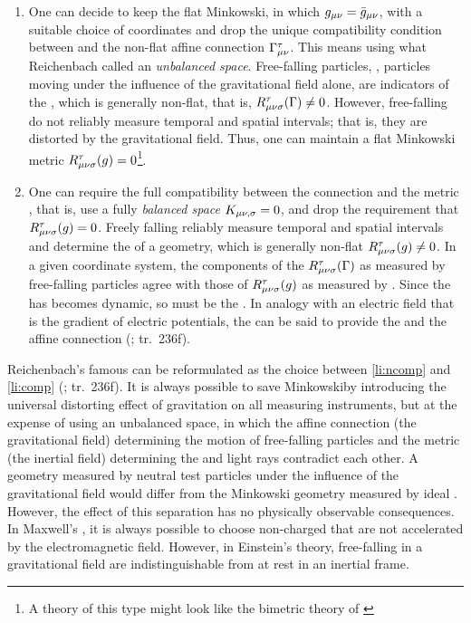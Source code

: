 \documentclass[final]{article}
\renewcommand{\Mink}{Minkowski\xspace}
\renewcommand{\rzlp}[2]{(\cite[#1]{Reichenbach1928}; tr.\ #2)\xspace}
\begin{document}
\begin{enumerate}[label=(\alph*)] 
 \item \label{li:ncomp} One can decide to keep the flat \Mink \spti, in which $g_{\mu\nu}=\bar{g}_{\mu\nu}$, with a suitable choice of coordinates and drop the unique compatibility condition between \gmn and the non-flat affine connection $\Gamma^\tau_{\mu\nu}$. This means using what Reichenbach called an \emph{unbalanced space}. Free-falling particles, \thatis, particles moving under the influence of the gravitational field alone, are indicators of the \Gtmn, which is generally non-flat, that is, $R_{\mu \nu \sigma}^{\tau}(\Gamma) \neq 0$. However, free-falling \rac do not reliably measure temporal and spatial intervals; that is, they are distorted by the gravitational field. Thus, one can maintain a flat \Mink metric $R_{\mu \nu \sigma}^{\tau} (g)=0$\footnote{A theory of this type might look like the bimetric theory of \cite{Rosen1940,Rosen1940a}}.
 
\item \label{li:comp} One can require the full compatibility between the connection \Gtmn and the metric \gmn, that is, use a fully \emph{balanced space} $K_{\mu \nu, \sigma} = 0$, and drop the requirement that $R_{\mu \nu \sigma}^{\tau} (g)=0$. Freely falling \rac reliably measure temporal and spatial intervals and determine the \gmn of a geometry, which is generally non-flat $R_{\mu \nu \sigma}^{\tau} (g) \neq 0$. In a given coordinate system, the components of the $R_{\mu \nu \sigma}^{\tau}(\Gamma)$ as measured by free-falling particles agree with those of $R_{\mu \nu \sigma}^{\tau} (g)$ as measured by \rac. Since the \Gtmn has becomes dynamic, so must be the \gmn. In analogy with an electric field that is the gradient of electric potentials, the \gmn can be said to provide the  and the affine connection  \rzlp{271f}{236f}.
\end{enumerate}
%
Reichenbach's famous  can be reformulated as the choice between \cref{li:ncomp} and \cref{li:comp} \rzlp{271f}{236f}. It is always possible to save \Mink \spti by introducing the universal distorting effect of gravitation on all measuring instruments, but at the expense of using an unbalanced space, in which the affine connection (the gravitational field) determining the motion of free-falling particles and the metric (the inertial field) determining the \rac and light rays contradict each other. A  geometry measured by neutral test particles under the influence of the gravitational field would differ from the  \Mink geometry measured by ideal \rac \citep{Stachel2007}. However, the effect of this separation has no physically observable consequences. In Maxwell's \ed, it is always possible to choose non-charged \rac that are not accelerated by the electromagnetic field. However, in Einstein's theory, \rac free-falling in a gravitational field are indistinguishable from \rac at rest in an inertial frame.
\end{document}
